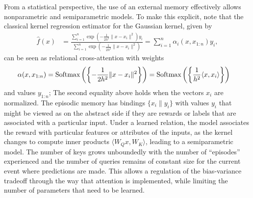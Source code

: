 From a statistical perspective, the use of an external memory effectively allows nonparametric and semiparametric models. To make this explicit, note that the classical kernel regression estimator for the Gaussian kernel,
given by
\begin{align*}
  \hat f(x) &= \frac{\sum_{i=1}^n \exp\left(-\frac{1}{2h^2} \|x-x_i\|^2\right) y_i}{\sum_{i=1}^n \exp\left(-\frac{1}{2h^2} \|x-x_i\|^2\right)} 
  = \sum_{i=1}^n \alpha_i(x, x_{1:n}) y_i,
\end{align*}
can be seen as relational cross-attention with weights
\begin{align*}
    \alpha(x, x_{1:n}) &= \Softmax\left(\left\{-\frac{1}{2h^2}\|x-x_i\|^2\right\}\right) 
    = \Softmax\left(\left\{\frac{1}{h^2}\langle x, x_i\rangle\right\}\right)
\end{align*}
and values $y_{1:n}$; The second equality above holds when the vectors $x_i$ are normalized.
The episodic memory has bindings $\{x_i\| y_i\}$ with values $y_i$ that 
might be viewed as on the abstract side if they are rewards or labels that are associated with 
a particular input. Under a learned relation, the model associates the reward with particular features or attributes of the inputs, as the kernel changes to compute inner products $\langle W_Q x, W_K \rangle$, leading 
to a semiparametric model. 
The number of keys grows unboundedly with the number of ``episodes'' experienced 
and the number of queries remains of constant size for the current event where predictions are made.
This allows a regulation of the bias-variance tradeoff through the way that attention is implemented, 
while limiting the number of parameters that need to be learned.

